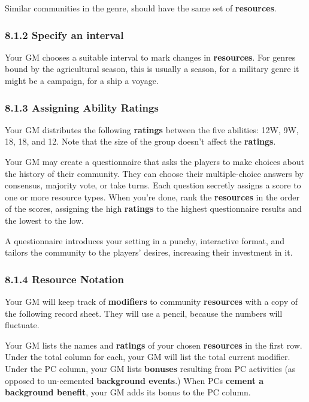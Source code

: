 \documentclass[
]{article}
\begin{document}
Similar communities in the genre, should have the same set of
\textbf{resources}.

\hypertarget{specify-an-interval}{%
\subsubsection{8.1.2 Specify an interval}\label{specify-an-interval}}

Your GM chooses a suitable interval to mark changes in
\textbf{resources}. For genres bound by the agricultural season, this is
usually a season, for a military genre it might be a campaign, for a
ship a voyage.

\hypertarget{assigning-ability-ratings-1}{%
\subsubsection{8.1.3 Assigning Ability
Ratings}\label{assigning-ability-ratings-1}}

Your GM distributes the following \textbf{ratings} between the five
abilities: 12W, 9W, 18, 18, and 12. Note that the size of the group
doesn't affect the \textbf{ratings}.

Your GM may create a questionnaire that asks the players to make choices
about the history of their community. They can choose their
multiple-choice answers by consensus, majority vote, or take turns. Each
question secretly assigns a score to one or more resource types. When
you're done, rank the \textbf{resources} in the order of the scores,
assigning the high \textbf{ratings} to the highest questionnaire results
and the lowest to the low.

A questionnaire introduces your setting in a punchy, interactive format,
and tailors the community to the players' desires, increasing their
investment in it.

\hypertarget{resource-notation}{%
\subsubsection{8.1.4 Resource Notation}\label{resource-notation}}

Your GM will keep track of \textbf{modifiers} to community
\textbf{resources} with a copy of the following record sheet. They will
use a pencil, because the numbers will fluctuate.

Your GM lists the names and \textbf{ratings} of your chosen
\textbf{resources} in the first row. Under the total column for each,
your GM will list the total current modifier. Under the PC column, your
GM lists \textbf{bonuses} resulting from PC activities (as opposed to
un-cemented \textbf{background events}.) When PCs \textbf{cement a
background benefit}, your GM adds its bonus to the PC column.
\end{document}

